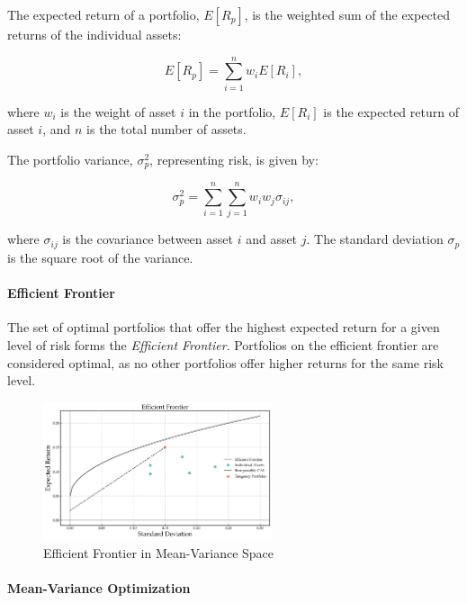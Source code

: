 The expected return of a portfolio, $E[R_p]$, is the weighted sum of the expected returns of the individual assets:

\begin{equation}
    E[R_p] = \sum_{i=1}^{n} w_i E[R_i],
\end{equation}

where $w_i$ is the weight of asset $i$ in the portfolio, $E[R_i]$ is the expected return of asset $i$, and $n$ is the total number of assets.

The portfolio variance, $\sigma_p^2$, representing risk, is given by:

\begin{equation}
    \sigma_p^2 = \sum_{i=1}^{n} \sum_{j=1}^{n} w_i w_j \sigma_{ij},
\end{equation}

where $\sigma_{ij}$ is the covariance between asset $i$ and asset $j$. The standard deviation $\sigma_p$ is the square root of the variance.

\paragraph{Efficient Frontier}

The set of optimal portfolios that offer the highest expected return for a given level of risk forms the \textit{Efficient Frontier}. Portfolios on the efficient frontier are considered optimal, as no other portfolios offer higher returns for the same risk level.

\begin{figure}[h]
    \centering
    \includegraphics[width=0.6\textwidth]{figures/efficient_frontier.png}
    \caption{Efficient Frontier in Mean-Variance Space}
    \label{fig:efficient_frontier}
\end{figure}

\paragraph{Mean-Variance Optimization}

